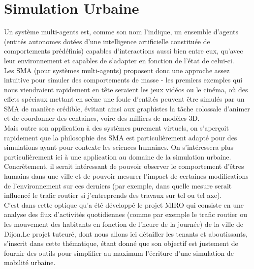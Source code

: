 \documentclass[11pt]{report} %
\begin{document}

\tableofcontents
\newpage

\chapter{Simulation Urbaine}
Un syst\`eme multi-agents est, comme son nom l'indique, un ensemble d'agents (entit\'es autonomes dot\'ees d'une intelligence artificielle constitu\'ee de comportements pr\'ed\'efinis) capables d'interactions aussi bien entre eux, qu'avec leur environnement et capables de s'adapter en fonction de l'\'etat de celui-ci.\\
Les SMA (pour syst\`emes multi-agents) proposent donc une approche assez intuitive pour simuler des comportements \og de masse \fg - les premiers exemples qui nous viendraient rapidement en t\^ete seraient les jeux vid\'eos ou le cin\'ema, o\`u des effets sp\'eciaux mettant en sc\`ene une foule d'entit\'es peuvent \^etre simul\'es par un SMA de mani\`ere cr\'edible, \'evitant ainsi aux graphistes la tâche colossale d'animer et de coordonner des centaines, voire des milliers de mod\`eles 3D.\\
Mais outre son application \`a des syst\`emes purement virtuels, on s'aperçoit rapidement que la philosophie des SMA est particuli\`erement adapt\'e pour des simulations ayant pour contexte les sciences humaines. On s'int\'eressera plus particuli\`erement ici \`a une application au domaine de la simulation urbaine. Concr\`etement, il serait int\'eressant de pouvoir observer le comportement d'\^etres humains dans une ville et de pouvoir mesurer l'impact de certaines modifications de l'environnement sur ces derniers (par exemple, dans quelle mesure serait influenc\'e le trafic routier si j'entreprends des travaux sur tel ou tel axe).\\
C'est dans cette optique qu'a \'et\'e d\'evelopp\'e le projet MIRO qui consiste en une analyse des flux d'activit\'es quotidiennes (comme par exemple le trafic routier ou les mouvement des habitants en fonction de l'heure de la journ\'ee) de la ville de Dijon.Le projet tuteur\'e, dont nous allons ici d\'etailler les tenants et aboutissants, s'inscrit dans cette th\'ematique, \'etant donn\'e que son objectif est justement de fournir des outils pour simplifier au maximum l'\'ecriture d'une simulation de mobilit\'e urbaine.
\end{document}
